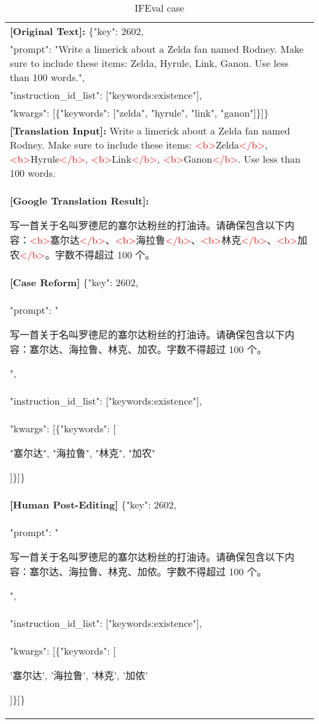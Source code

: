 \begin{table}[t!]
    \centering 
    \tiny
    \begin{tabular}{|p{7.2cm}|}
        \hline
        \textbf{[Original Text]:} \{"key": 2602, \\
        "prompt": "Write a limerick about a Zelda fan named Rodney. Make sure to include these items: Zelda, Hyrule, Link, Ganon. Use less than 100 words.",\\ "instruction\_id\_list": ["keywords:existence"],\\
        "kwargs": [\{"keywords": ["zelda", "hyrule", "link", "ganon"]\}]\} \\
        \hline
        \textbf{[Translation Input]:} Write a limerick about a Zelda fan named Rodney. Make sure to include these items: \textcolor{red}{<b>}Zelda\textcolor{red}{</b>}, \textcolor{red}{<b>}Hyrule\textcolor{red}{</b>}, \textcolor{red}{<b>}Link\textcolor{red}{</b>}, \textcolor{red}{<b>}Ganon\textcolor{red}{</b>}. Use less than 100 words.\\ 
        \textbf{[Google Translation Result]:} \begin{CJK}{UTF8}{gbsn}写一首关于名叫罗德尼的塞尔达粉丝的打油诗。请确保包含以下内容：\textcolor{red}{<b>}塞尔达\textcolor{red}{</b>}、\textcolor{red}{<b>}海拉鲁\textcolor{red}{</b>}、\textcolor{red}{<b>}林克\textcolor{red}{</b>}、\textcolor{red}{<b>}加农\textcolor{red}{</b>}。字数不得超过 100 个。\end{CJK}\\
        \textbf{[Case Reform]} \{"key": 2602, \\
        "prompt": " \begin{CJK}{UTF8}{gbsn}写一首关于名叫罗德尼的塞尔达粉丝的打油诗。请确保包含以下内容：塞尔达、海拉鲁、林克、加农。字数不得超过 100 个。\end{CJK}",\\ "instruction\_id\_list": ["keywords:existence"],\\
        "kwargs": [\{"keywords": [\begin{CJK}{UTF8}{gbsn}"塞尔达", "海拉鲁", "林克", "加农"\end{CJK}]\}]\} \\    
        \hline
        \textbf{[Human Post-Editing]} \{"key": 2602, \\
        "prompt": " \begin{CJK}{UTF8}{gbsn}写一首关于名叫罗德尼的塞尔达粉丝的打油诗。请确保包含以下内容：塞尔达、海拉鲁、林克、加侬。字数不得超过 100 个。\end{CJK}",\\ "instruction\_id\_list": ["keywords:existence"],\\
        "kwargs": [\{"keywords": [\begin{CJK}{UTF8}{gbsn}'塞尔达', '海拉鲁', '林克', '加侬'\end{CJK}]\}]\} \\   
        \hline
    \end{tabular}
    \caption{IFEval case}
    \label{tab:construction-case}
\end{table}




